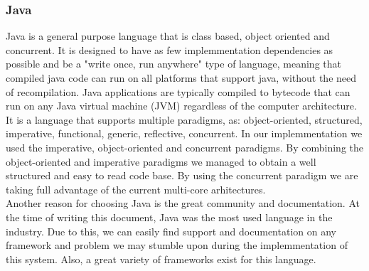 \subsubsection{Java}
\label{sec:programming-languages-java}
Java is a general purpose language that is class based, object oriented and concurrent. 
It is designed to have as few implemmentation dependencies as possible and be a "write once, run anywhere" type of language, meaning that compiled java code can run on all platforms that support java, without the need of recompilation.
Java applications are typically compiled to bytecode that can run on any Java virtual machine (JVM) regardless of the computer architecture.
\\ It is a language that supports multiple paradigms, as:  object-oriented, structured, imperative, functional, generic, reflective, concurrent. In our implemmentation we used the imperative, object-oriented and concurrent paradigms. By combining the object-oriented and imperative paradigms we managed to obtain a well structured and easy to read code base. By using the concurrent paradigm we are taking full advantage of the current multi-core arhitectures.
\\ Another reason for choosing Java is the great community and documentation. At the time of writing this document, Java was the most used language in the industry. Due to this, we can easily find support and documentation on any framework and problem we may stumble upon during the implemmentation of this system. Also, a great variety of frameworks exist for this language.


